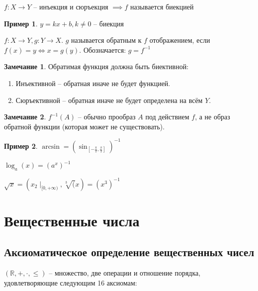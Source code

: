 \documentclass{book}
\newcommand\R{\ensuremath{\mathbb{R}}}
\theoremstyle{definition}
\newtheorem*{note}{Замечание}
\newtheorem*{example}{Пример}
\begin{document}
    \begin{definition}[биективность]
        $f:X\to Y$ -- инъекция и сюръекция $\implies f$ называется биекцией
    \end{definition}

    \begin{example}
        $y = kx+b, k\neq 0$ -- биекция
    \end{example}

    \begin{definition}
        $f:X\to Y, g:Y\to X$.
        $g$ называется обратным к $f$ отображением, если $f(x) = y \iff  x = g(y)$.
        Обозначается: $g = f^{-1}$
    \end{definition}
    \begin{note}
        Обратимая функция должна быть биективной:
        \begin{enumerate}
            \item Инъективной -- обратная иначе не будет функцией.
            \item Сюръективной -- обратная иначе не будет определена на всём $Y$.
        \end{enumerate}
    \end{note}
    
    \begin{note}
        $f^{-1}(A)$ -- обычно прообраз $A$ под действием $f$, а не образ обратной функции (которая может не существовать).
    \end{note}

    \begin{example}
       $\arcsin = (\sin _{[-\frac{\pi}{2}, \frac{\pi}{2}]  })^{-1}$

       $\log_a(x) = (a^x)^{-1}$

       $\sqrt{x} = (x_{2}\mid_{[0,+\infty )} , \sqrt[3](x) = (x^3)^{-1} $
    \end{example}
    
    \section{Вещественные числа}
    \subsection{Аксиоматическое определение вещественных чисел}

    $(\R, +, \cdot, \leqslant )$ -- множество, две операции и отношение порядка, удовлетворяющие следующим 16 аксиомам:
        
\end{document}

